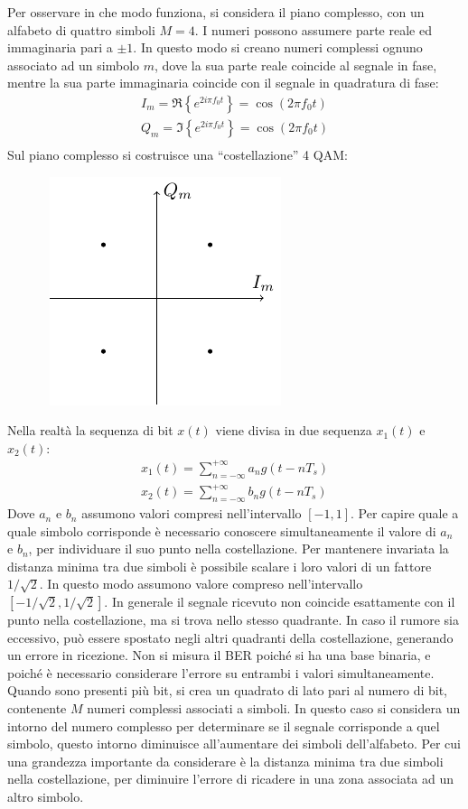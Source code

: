 \documentclass{article}
\numberwithin{equation}{subsection}
\begin{document}
Per osservare in che modo funziona, si considera il piano complesso, con un alfabeto di quattro simboli $M=4$. I numeri possono assumere parte reale ed immaginaria pari 
a $\pm1$. In questo modo si creano numeri complessi ognuno associato ad un simbolo $m$, dove la sua parte reale coincide al segnale in fase, mentre la sua parte immaginaria coincide con il segnale in 
quadratura di fase:
\begin{gather*}
    I_m=\Re\left\{e^{2i\pi f_0t}\right\}=\cos(2\pi f_0t)\\
    Q_m=\Im\left\{e^{2i\pi f_0t}\right\}=\cos(2\pi f_0t)\\
\end{gather*}
Sul piano complesso si costruisce una ``costellazione'' 4 QAM:
\begin{figure}[H]%
    \centering\
    \includegraphics{4qam.pdf}
\end{figure}


Nella realtà la sequenza di bit $x(t)$ viene divisa in due sequenza $x_1(t)$ e $x_2(t)$:
\begin{gather*}
    x_1(t)=\displaystyle\sum_{n=-\infty}^{+\infty}a_ng(t-nT_s)\\
    x_2(t)=\displaystyle\sum_{n=-\infty}^{+\infty}b_ng(t-nT_s)
\end{gather*}
Dove $a_n$ e $b_n$ assumono valori compresi nell'intervallo $[-1,1]$. Per capire quale a quale simbolo corrisponde è 
necessario conoscere simultaneamente il valore di $a_n$ e $b_n$, per individuare il suo punto nella costellazione. 
Per mantenere invariata la distanza minima tra due simboli è possibile scalare i loro valori di un fattore $1/\sqrt2$. In questo modo assumono 
valore compreso nell'intervallo $[-1/\sqrt2,1/\sqrt2]$. In generale il segnale ricevuto non coincide esattamente con il punto nella costellazione, ma si trova 
nello stesso quadrante. In caso il rumore sia eccessivo, può essere spostato negli altri quadranti della costellazione, generando un errore in ricezione. 
Non si misura il BER poiché si ha una base binaria, e poiché è necessario considerare l'errore su entrambi i 
valori simultaneamente. 
Quando sono presenti più bit, si crea un quadrato di lato pari al numero di bit, contenente $M$ numeri complessi associati a simboli. In questo caso si considera un 
intorno del numero complesso per determinare se il segnale corrisponde a quel simbolo, questo intorno diminuisce all'aumentare dei simboli dell'alfabeto. Per cui 
una grandezza importante da considerare è la distanza minima tra due simboli nella costellazione, per diminuire l'errore di ricadere in una zona associata ad un 
altro simbolo.  
\end{document}
